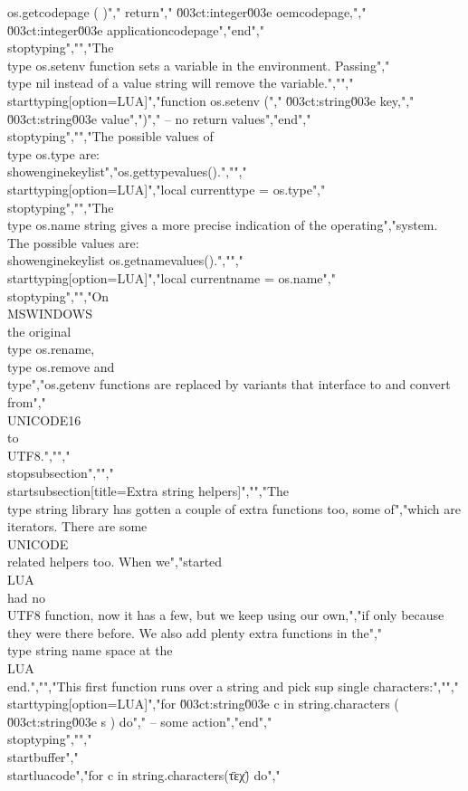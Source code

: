 os.getcodepage ( )","    return","        \u003ct:integer\u003e oemcodepage,","        \u003ct:integer\u003e applicationcodepage","end","\\stoptyping","","The \\type {os.setenv} function sets a variable in the environment. Passing","\\type {nil} instead of a value string will remove the variable.","","\\starttyping[option=LUA]","function os.setenv (","    \u003ct:string\u003e key,","    \u003ct:string\u003e value",")","    -- no return values","end","\\stoptyping","","The possible values of \\type {os.type} are: \\showenginekeylist","{os.gettypevalues()}.","","\\starttyping[option=LUA]","local currenttype = os.type","\\stoptyping","","The \\type {os.name} string gives a more precise indication of the operating","system. The possible values are: \\showenginekeylist {os.getnamevalues()}.","","\\starttyping[option=LUA]","local currentname = os.name","\\stoptyping","","On \\MSWINDOWS\\ the original \\type {os.rename}, \\type {os.remove} and \\type","{os.getenv} functions are replaced by variants that interface to and convert from","\\UNICODE16\\ to \\UTF8.","","\\stopsubsection","","\\startsubsection[title=Extra string helpers]","","The \\type {string} library has gotten a couple of extra functions too, some of","which are iterators. There are some \\UNICODE\\ related helpers too. When we","started \\LUA\\ had no \\UTF8 function, now it has a few, but we keep using our own,","if only because they were there before. We also add plenty extra functions in the","\\type {string} name space at the \\LUA\\ end.","","This first function runs over a string and pick sup single characters:","","\\starttyping[option=LUA]","for \u003ct:string\u003e c in string.characters ( \u003ct:string\u003e s ) do","    -- some action","end","\\stoptyping","","\\startbuffer","\\startluacode","for c in string.characters(\"τεχ\") do","  